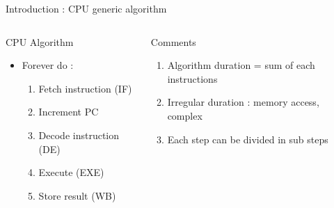 \begin{Frame}{Introduction : CPU generic  algorithm}
 \begin{columns}[t]
  \begin{column}{0.5\textwidth}
    \begin{block}{CPU Algorithm}
      \begin{itemize}
      \item Forever do :
        \begin{enumerate}
        \item Fetch instruction (IF)
        \item Increment PC
        \item Decode instruction (DE)
        \item Execute (EXE)
        \item Store result (WB)
        \end{enumerate}
      \end{itemize}
    \end{block}
  \end{column}
  \begin{column}{0.5\textwidth}
    \begin{block}{Comments}
      \begin{enumerate}
      \item Algorithm duration = sum of each instructions
      \item Irregular duration : memory access, complex 
      \item Each step can be divided in sub steps
      \end{enumerate}
    \end{block}
  \end{column}
 \end{columns}
\end{Frame}
